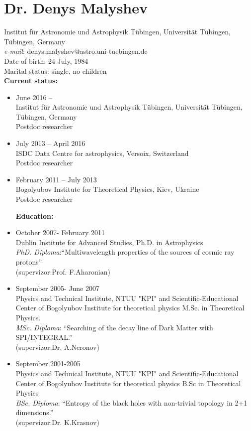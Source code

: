 \documentclass{article} \oddsidemargin -0,05 cm \textwidth
\begin{document}
\section*{Dr. Denys Malyshev}
 \noindent
Institut f{\"u}r Astronomie und Astrophysik T{\"u}bingen, Universit{\"a}t T{\"u}bingen,  T{\"u}bingen, Germany \\
\emph{e-mail}: denys.malyshev@astro.uni-tuebingen.de \\
Date of birth: 24 July, 1984\\
Marital status: single, no children\\
\textbf{Current status:}
\begin{itemize}
\item June 2016 -- \\
Institut f{\"u}r Astronomie und Astrophysik T{\"u}bingen, Universit{\"a}t T{\"u}bingen,  T{\"u}bingen, Germany  \\
Postdoc researcher

\item July 2013 -- April 2016\\
ISDC Data Centre for astrophysics, Versoix, Switzerland \\
Postdoc researcher

\item February 2011 -- July 2013\\
Bogolyubov Institute for Theoretical Physics, Kiev, Ukraine\\
Postdoc researcher

\textbf{Education:}
 \item  October 2007- February 2011\\
    Dublin Institute for Advanced Studies, Ph.D. in Astrophysics \\
    \emph{PhD. Diploma}:``Multiwavelength properties of the sources of cosmic ray protons'' \\(supervizor:Prof. F.Aharonian)


  \item      September 2005- June 2007 \\
  Physics and Technical Institute, NTUU "KPI" and
      Scientific-Educational Center of Bogolyubov Institute for theoretical physics
      M.Sc. in Theoretical Physics.\\
           \emph{MSc. Diploma}: ``Searching of the decay line of Dark Matter with SPI/INTEGRAL.''\\(supervizor:Dr. A.Neronov)


    \item      September 2001-2005\\
      Physics and Technical Institute, NTUU "KPI" and
      Scientific-Educational Center of Bogolyubov Institute for theoretical physics
      B.Sc in Theoretical Physics\\
           \emph{BSc. Diploma}: ``Entropy of the black holes with non-trivial topology in 2+1 dimensions.''\\ (supervizor:Dr. K.Krasnov)

\end{itemize}
\end{document}
